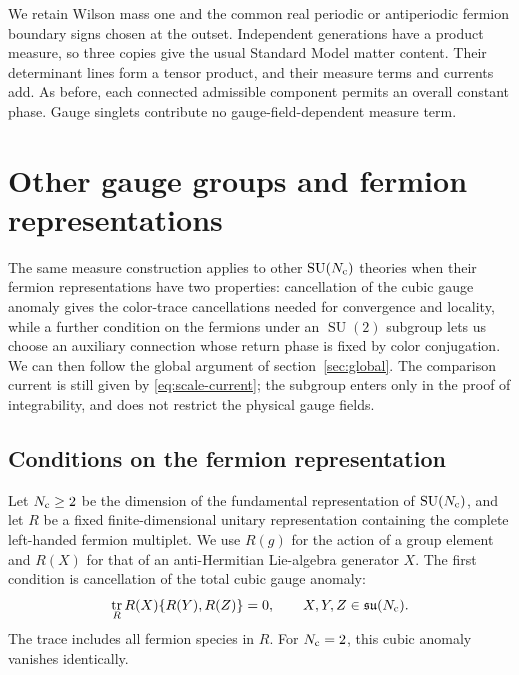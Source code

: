\documentclass[11pt,a4paper]{article}
\theoremstyle{remark}
\DeclareMathOperator{\tr}{tr}
\DeclareMathOperator{\SU}{SU}
\begin{document}
We retain Wilson mass one and the common real periodic or antiperiodic
fermion boundary signs chosen at the outset. Independent generations
have a product measure, so three copies give the usual Standard Model
matter content. Their determinant lines form a tensor product, and their
measure terms and currents add. As before, each connected admissible
component permits an overall constant phase. Gauge singlets contribute
no gauge-field-dependent measure term.

\section{Other gauge groups and fermion representations}
\label{sec:other-representations}

The same measure construction applies to other $\SU(N_{\rm c})$ theories
when their fermion representations have two properties: cancellation of
the cubic gauge anomaly gives the color-trace cancellations needed for
convergence and locality, while a further condition on the fermions under an
$\SU(2)$ subgroup lets us choose an auxiliary connection whose return
phase is fixed by color conjugation. We can then follow the global
argument of section~\ref{sec:global}. The comparison current is still
given by \eqref{eq:scale-current}; the subgroup enters only in the
proof of integrability, and does not restrict the physical gauge fields.

\subsection{Conditions on the fermion representation}

Let $N_{\rm c}\geq2$ be the dimension of the fundamental representation
of $\SU(N_{\rm c})$, and let $R$ be a fixed finite-dimensional unitary
representation containing the complete left-handed fermion multiplet.
We use $R(g)$ for the action of a group element and $R(X)$ for that of
an anti-Hermitian Lie-algebra generator $X$. The first condition is
cancellation of the total cubic gauge anomaly:
\begin{equation}
 \tr_R R(X)\{R(Y),R(Z)\}=0,
 \qquad X,Y,Z\in\mathfrak{su}(N_{\rm c}).
 \label{gen:anomaly}
\end{equation}
The trace includes all fermion species in $R$. For $N_{\rm c}=2$,
this cubic anomaly vanishes identically.
\end{document}
